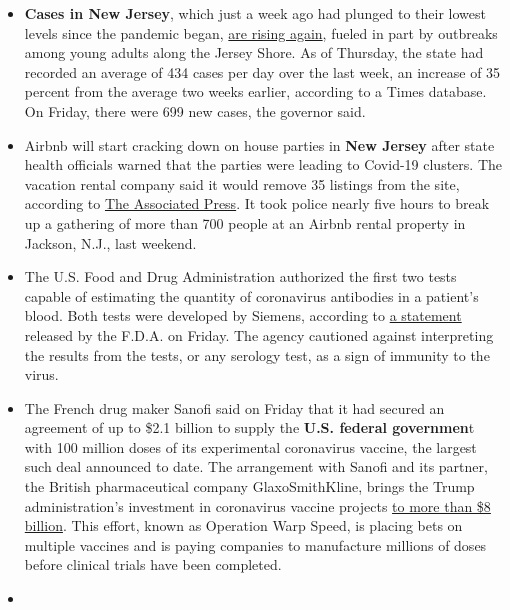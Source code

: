\begin{itemize}
\item
  \textbf{Cases in New Jersey}, which just a week ago had plunged to
  their lowest levels since the pandemic began,
  \href{https://www.nytimes.com/2020/07/30/nyregion/coronavirus-cases-nj.html}{are
  rising again}, fueled in part by outbreaks among young adults along
  the Jersey Shore. As of Thursday, the state had recorded an average of
  434 cases per day over the last week, an increase of 35 percent from
  the average two weeks earlier, according to a Times database. On
  Friday, there were 699 new cases, the governor said.
\item
  Airbnb will start cracking down on house parties in \textbf{New
  Jersey} after state health officials warned that the parties were
  leading to Covid-19 clusters. The vacation rental company said it
  would remove 35 listings from the site, according to
  \href{https://apnews.com/c64053bb7f7b60001a314526da06732e}{The
  Associated Press}. It took police nearly five hours to break up a
  gathering of more than 700 people at an Airbnb rental property in
  Jackson, N.J., last weekend.
\item
  The U.S. Food and Drug Administration authorized the first two tests
  capable of estimating the quantity of coronavirus antibodies in a
  patient's blood. Both tests were developed by Siemens, according to
  \href{https://www.fda.gov/news-events/press-announcements/coronavirus-covid-19-update-fda-authorizes-first-tests-estimate-patients-antibodies-past-sars-cov-2}{a
  statement} released by the F.D.A. on Friday. The agency cautioned
  against interpreting the results from the tests, or any serology test,
  as a sign of immunity to the virus.
\item
  The French drug maker Sanofi said on Friday that it had secured an
  agreement of up to \$2.1 billion to supply the \textbf{U.S. federal
  governmen}t with 100 million doses of its experimental coronavirus
  vaccine, the largest such deal announced to date. The arrangement with
  Sanofi and its partner, the British pharmaceutical company
  GlaxoSmithKline, brings the Trump administration's investment in
  coronavirus vaccine projects
  \href{https://medicalcountermeasures.gov/app/barda/coronavirus/COVID19.aspx?filter=vaccine}{to
  more than \$8 billion}. This effort, known as Operation Warp Speed, is
  placing bets on multiple vaccines and is paying companies to
  manufacture millions of doses before clinical trials have been
  completed.
\item

\end{itemize}
